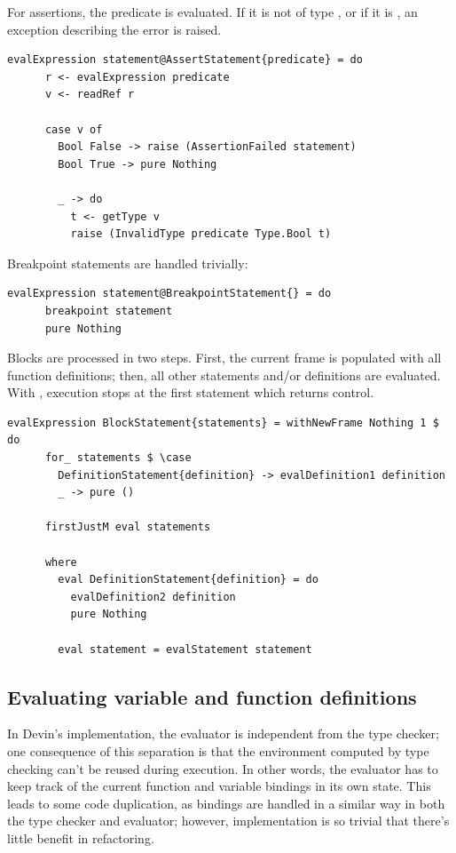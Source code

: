 \documentclass[UdineBachThesis,american,11pt]{PhdThesis}
\begin{document}
  \newpage

  For assertions, the predicate is evaluated. If it is not of type
  \lstinline@Bool@, or if it is \lstinline@false@, an exception describing the
  error is raised.

  \begin{lstlisting}[gobble=4,basicstyle=\ttfamily\small]
    evalExpression statement@AssertStatement{predicate} = do
      r <- evalExpression predicate
      v <- readRef r

      case v of
        Bool False -> raise (AssertionFailed statement)
        Bool True -> pure Nothing

        _ -> do
          t <- getType v
          raise (InvalidType predicate Type.Bool t)
  \end{lstlisting}

  Breakpoint statements are handled trivially:

  \begin{lstlisting}[gobble=4,basicstyle=\ttfamily\small]
    evalExpression statement@BreakpointStatement{} = do
      breakpoint statement
      pure Nothing
  \end{lstlisting}

  Blocks are processed in two steps. First, the current frame is populated with
  all function definitions; then, all other statements and/or definitions are
  evaluated. With \lstinline@firstJustM@, execution stops at the first statement
  which returns control.

  \begin{lstlisting}[gobble=4,basicstyle=\ttfamily\small]
    evalExpression BlockStatement{statements} = withNewFrame Nothing 1 $ do
      for_ statements $ \case
        DefinitionStatement{definition} -> evalDefinition1 definition
        _ -> pure ()

      firstJustM eval statements

      where
        eval DefinitionStatement{definition} = do
          evalDefinition2 definition
          pure Nothing

        eval statement = evalStatement statement
  \end{lstlisting}

  \subsection{Evaluating variable and function definitions}

  In Devin's implementation, the evaluator is independent from the type checker;
  one consequence of this separation is that the environment computed by type
  checking can't be reused during execution. In other words, the evaluator has
  to keep track of the current function and variable bindings in its own state.
  This leads to some code duplication, as bindings are handled in a similar way
  in both the type checker and evaluator; however, implementation is so trivial
  that there's little benefit in refactoring.
\end{document}
